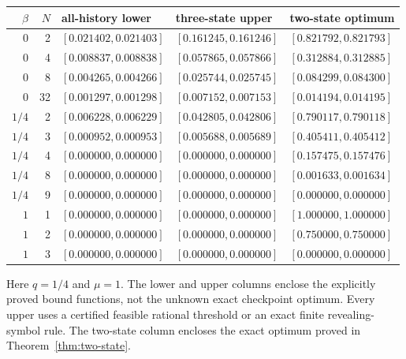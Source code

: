 \begin{center}
\small
\begin{tabular}{@{}rrlll@{}}
\toprule
$\beta$ & $N$ & all-history lower & three-state upper & two-state optimum \\
\midrule
$0$ & 2 & $[0.021402, 0.021403]$ & $[0.161245, 0.161246]$ & $[0.821792, 0.821793]$ \\
$0$ & 4 & $[0.008837, 0.008838]$ & $[0.057865, 0.057866]$ & $[0.312884, 0.312885]$ \\
$0$ & 8 & $[0.004265, 0.004266]$ & $[0.025744, 0.025745]$ & $[0.084299, 0.084300]$ \\
$0$ & 32 & $[0.001297, 0.001298]$ & $[0.007152, 0.007153]$ & $[0.014194, 0.014195]$ \\
$1/4$ & 2 & $[0.006228, 0.006229]$ & $[0.042805, 0.042806]$ & $[0.790117, 0.790118]$ \\
$1/4$ & 3 & $[0.000952, 0.000953]$ & $[0.005688, 0.005689]$ & $[0.405411, 0.405412]$ \\
$1/4$ & 4 & $[0.000000, 0.000000]$ & $[0.000000, 0.000000]$ & $[0.157475, 0.157476]$ \\
$1/4$ & 8 & $[0.000000, 0.000000]$ & $[0.000000, 0.000000]$ & $[0.001633, 0.001634]$ \\
$1/4$ & 9 & $[0.000000, 0.000000]$ & $[0.000000, 0.000000]$ & $[0.000000, 0.000000]$ \\
$1$ & 1 & $[0.000000, 0.000000]$ & $[0.000000, 0.000000]$ & $[1.000000, 1.000000]$ \\
$1$ & 2 & $[0.000000, 0.000000]$ & $[0.000000, 0.000000]$ & $[0.750000, 0.750000]$ \\
$1$ & 3 & $[0.000000, 0.000000]$ & $[0.000000, 0.000000]$ & $[0.000000, 0.000000]$ \\
\bottomrule
\end{tabular}
\end{center}
Here $q=1/4$ and $\mu=1$. The lower and upper columns enclose the explicitly proved bound functions, not the unknown exact checkpoint optimum. Every upper uses a certified feasible rational threshold or an exact finite revealing-symbol rule. The two-state column encloses the exact optimum proved in Theorem~\ref{thm:two-state}.
